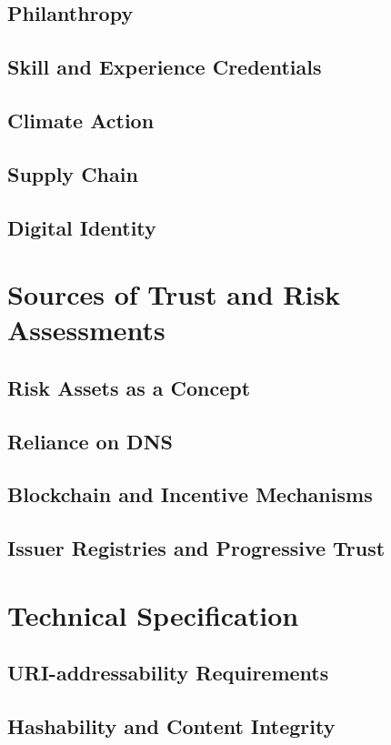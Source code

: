 \documentclass[11pt]{article}
\begin{document}
\subsection{Philanthropy}
\subsection{Skill and Experience Credentials}
\subsection{Climate Action}
\subsection{Supply Chain}
\subsection{Digital Identity}

\section{Sources of Trust and Risk Assessments}
\subsection{Risk Assets as a Concept}
\subsection{Reliance on DNS}
\subsection{Blockchain and Incentive Mechanisms}
\subsection{Issuer Registries and Progressive Trust}

\section{Technical Specification}
\subsection{URI-addressability Requirements}
\subsection{Hashability and Content Integrity}
\end{document}
